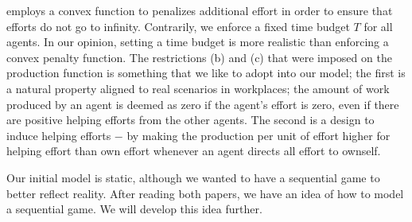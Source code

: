 \documentclass[a4paper,10pt]{article}
\theoremstyle{definition}
\begin{document}
	\cite{Drago1991} employs a convex function to penalizes additional effort in order to ensure that efforts do not go to infinity. Contrarily, we enforce a fixed time budget $T$ for all agents. In our opinion, setting a time budget is more realistic than enforcing a convex penalty function. The restrictions (b) and (c) that were imposed on the production function is something that we like to adopt into our model; the first is a natural property aligned to real scenarios in workplaces; the amount of work produced by an agent is deemed as zero if the agent's effort is zero, even if there are positive helping efforts from the other agents. The second is a design to induce helping efforts $-$ by making the production per unit of effort higher for helping effort than own effort whenever an agent directs all effort to ownself.

	
	Our initial model is static, although we wanted to have a sequential game to better reflect reality. After reading both papers, we have an idea of how to model a sequential game. We will develop this idea further.




 



%
%
%
%
\end{document}
